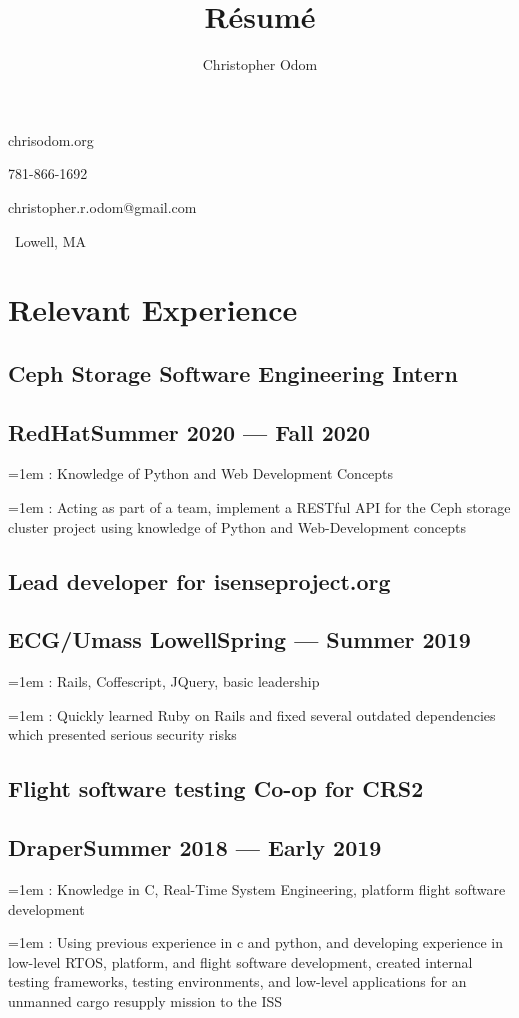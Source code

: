 \documentclass[11pt]{article}
\makeatletter
\newcommand\textbox[1]{%
	\parbox{.333\textwidth}{#1}%
}
\newcommand\describe[2]{

	\hangindent=1em
	\hangafter=1
	\noindent\hspace{1em}{\it#1}: #2
}
\renewcommand{\maketitle}
{
	\begin{center}\huge \theauthor\end{center}
	{\large\noindent\textbox{chrisodom.org\hfill}\textbox{\hfill}\textbox{\hfill781-866-1692}}

	{\large\noindent\textbox{christopher.r.odom@gmail.com\hfill}\textbox{\hfill}\textbox{\hfill\ Lowell, MA}}
}
\makeatother
\begin{document}
\title{R\'esum\'e}
\author{Christopher Odom}

\maketitle

\section{Relevant Experience}

\subsection{Ceph Storage Software Engineering Intern}
\subsection{RedHat\dotfill Summer 2020 --- Fall 2020}
\describe{Skills Used}{
	Knowledge of Python and Web Development Concepts
}
\describe{Roles}{
	Acting as part of a team, implement a RESTful API for the Ceph storage
	cluster project using knowledge of Python and Web-Development concepts
}

\subsection{Lead developer for isenseproject.org}
\subsection{ECG/Umass Lowell\dotfill Spring --- Summer 2019}
\describe{Skills Used}{
	Rails, Coffescript, JQuery, basic leadership
}
\describe{Roles}{
	Quickly learned Ruby on Rails and fixed several outdated dependencies
	which presented serious security risks
}

\subsection{Flight software testing Co-op for CRS2}
\subsection{Draper\dotfill Summer 2018 --- Early 2019}
\describe{Skills Used}{
	Knowledge in C, Real-Time System Engineering, platform
	flight software development
}
\describe{Roles}{
	Using previous experience in c and python, and
	developing experience in low-level
	RTOS, platform, and flight software development,
	created internal testing frameworks, testing environments, and 
	low-level applications for an unmanned cargo resupply mission
	to the ISS
}
\end{document}

